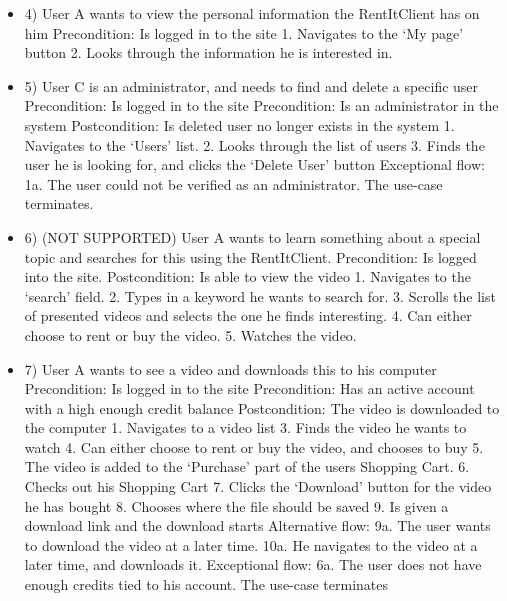 \begin{itemize}
\item 4)
User A wants to view the personal information the RentItClient has on him
\newline Precondition: Is logged in to the site
    1. Navigates to the ‘My page’ button
    2. Looks through the information he is interested in.

\item 5)
User C is an administrator, and needs to find and delete a specific user
\newline Precondition: Is logged in to the site
\newline Precondition: Is an administrator in the system
\newline Postcondition: Is deleted user no longer exists in the system
    1. Navigates to the ‘Users’ list.
    2. Looks through the list of users
    3. Finds the user he is looking for, and clicks the ‘Delete User’ button
\newline Exceptional flow:
    1a. The user could not be verified as an administrator. The use-case terminates.

\item 6) (NOT SUPPORTED)
User A wants to learn something about a special topic and searches for this using the RentItClient. 
\newline Precondition: Is logged into the site.
\newline Postcondition: Is able to view the video
    1. Navigates to the ‘search’ field. 
    2. Types in a keyword he wants to search for.
    3. Scrolls the list of presented videos and selects the one he finds interesting. 
    4. Can either choose to rent or buy the video.
    5. Watches the video.

\item 7)
User A wants to see a video and downloads this to his computer
\newline Precondition: Is logged in to the site
\newline Precondition: Has an active account with a high enough credit balance
\newline Postcondition: The video is downloaded to the computer
    1. Navigates to a video list
    3. Finds the video he wants to watch
    4. Can either choose to rent or buy the video, and chooses to buy
    5. The video is added to the ‘Purchase’ part of the users Shopping Cart.
    6. Checks out his Shopping Cart
    7. Clicks the ‘Download’ button for the video he has bought
    8. Chooses where the file should be saved
    9. Is given a download link and the download starts
\newline Alternative flow:
    9a. The user wants to download the video at a later time.
    10a. He navigates to the video at a later time, and downloads it.
\newline Exceptional flow:
    6a. The user does not have enough credits tied to his account. The use-case terminates 


\end{itemize}

